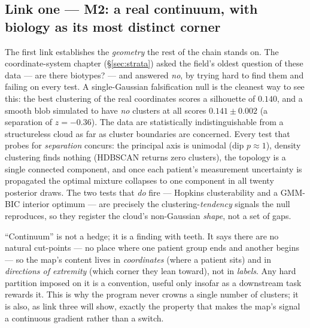 \subsection{Link one --- M2: a real continuum, with biology as its most distinct corner}
The first link establishes the \emph{geometry} the rest of the chain stands on. The coordinate-system chapter
(\S\ref{sec:strata}) asked the field's oldest question of these data --- are there biotypes? --- and
answered \emph{no}, by trying hard to find them and failing on every test. A single-Gaussian falsification
null is the cleanest way to see this: the best clustering of the real coordinates scores a silhouette of
$0.140$, and a smooth blob simulated to have \emph{no} clusters at all scores $0.141\pm0.002$ (a separation
of $z=-0.36$). The data are statistically indistinguishable from a structureless cloud as far as cluster
boundaries are concerned. Every test that probes for \emph{separation} concurs: the principal axis is unimodal
(dip $p\approx1$), density clustering finds nothing (HDBSCAN returns zero clusters), the topology is a single
connected component, and once each patient's measurement uncertainty is propagated the optimal mixture
collapses to one component in all twenty posterior draws. The two tests that \emph{do} fire --- Hopkins
clusterability and a GMM-BIC interior optimum --- are precisely the clustering-\emph{tendency} signals the null
reproduces, so they register the cloud's non-Gaussian \emph{shape}, not a set of gaps.

\begin{definitionbox}
``Continuum'' is not a hedge; it is a finding with teeth. It says there are no natural cut-points --- no
place where one patient group ends and another begins --- so the map's content lives in \emph{coordinates}
(where a patient sits) and in \emph{directions of extremity} (which corner they lean toward), not in
\emph{labels}. Any hard partition imposed on it is a convention, useful only insofar as a downstream task
rewards it. This is why the program never crowns a single number of clusters; it is also, as link three
will show, exactly the property that makes the map's signal a continuous gradient rather than a switch.
\end{definitionbox}

